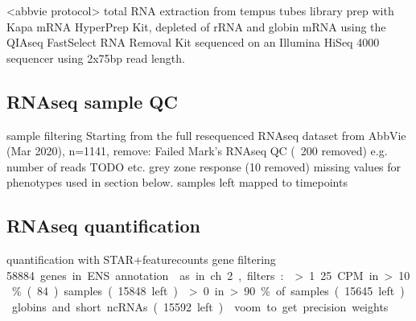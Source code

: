 \begin{outline}
%

\1 <abbvie protocol>
    \2 total RNA extraction from tempus tubes
    \2 library prep with Kapa mRNA HyperPrep Kit, depleted of rRNA and globin mRNA using the QIAseq FastSelect RNA Removal Kit 
    \2 sequenced on an Illumina HiSeq 4000 sequencer using 2x75bp read length.

\subsection{RNAseq sample QC}

\1 sample filtering
    \2 Starting from the full resequenced RNAseq dataset from AbbVie (Mar 2020), n=1141, remove:
    \2 Failed Mark’s RNAseq QC (~200 removed) e.g. number of reads TODO etc.
    \2 grey zone response (10 removed)
    \2 missing values for phenotypes used in section below.
     samples left
     mapped to timepoints

\subsection{RNAseq quantification}

\1 quantification with STAR+featurecounts
\1 gene filtering
    \1 \SI{58884} genes in ENS annotation
    \1 as in ch 2, filters:
        \2 >1.25 CPM in >10\% (84) samples (15848 left)
        \2 >0 in >90\% of samples (15645 left)
        \2 globins and short ncRNAs (15592 left)
\1 voom to get precision weights


\end{outline}
